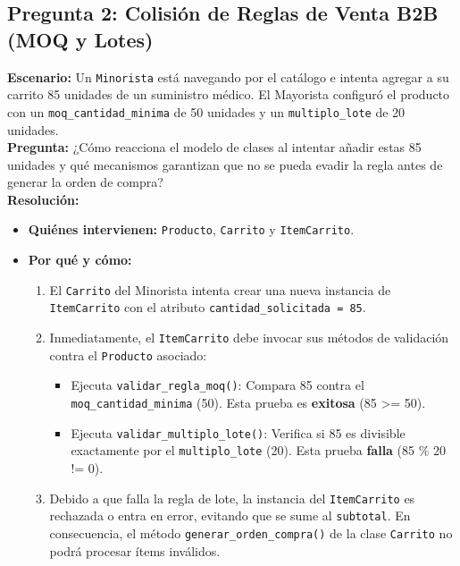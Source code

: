 \documentclass[12pt,a4paper]{report}
\begin{document}
\subsection*{Pregunta 2: Colisión de Reglas de Venta B2B (MOQ y Lotes)}
\textbf{Escenario:} Un \texttt{Minorista} está navegando por el catálogo e intenta agregar a su carrito 85 unidades de un suministro médico. El Mayorista configuró el producto con un \texttt{moq\_cantidad\_minima} de 50 unidades y un \texttt{multiplo\_lote} de 20 unidades.\\
\textbf{Pregunta:} ¿Cómo reacciona el modelo de clases al intentar añadir estas 85 unidades y qué mecanismos garantizan que no se pueda evadir la regla antes de generar la orden de compra?\\
\textbf{Resolución:}
\begin{itemize}
    \item \textbf{Quiénes intervienen:} \texttt{Producto}, \texttt{Carrito} y \texttt{ItemCarrito}.
    \item \textbf{Por qué y cómo:}
    \begin{enumerate}
        \item El \texttt{Carrito} del Minorista intenta crear una nueva instancia de \texttt{ItemCarrito} con el atributo \texttt{cantidad\_solicitada = 85}.
        \item Inmediatamente, el \texttt{ItemCarrito} debe invocar sus métodos de validación contra el \texttt{Producto} asociado:
        \begin{itemize}
            \item Ejecuta \texttt{validar\_regla\_moq()}: Compara 85 contra el \texttt{moq\_cantidad\_minima} (50). Esta prueba es \textbf{exitosa} (85 >= 50).
            \item Ejecuta \texttt{validar\_multiplo\_lote()}: Verifica si 85 es divisible exactamente por el \texttt{multiplo\_lote} (20). Esta prueba \textbf{falla} (85 \% 20 != 0).
        \end{itemize}
        \item Debido a que falla la regla de lote, la instancia del \texttt{ItemCarrito} es rechazada o entra en error, evitando que se sume al \texttt{subtotal}. En consecuencia, el método \texttt{generar\_orden\_compra()} de la clase \texttt{Carrito} no podrá procesar ítems inválidos.
    \end{enumerate}
\end{itemize}
\end{document}
